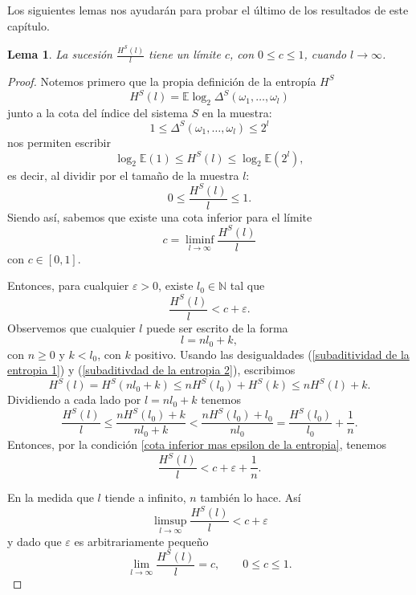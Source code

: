 \documentclass{report}
\newtheorem{lem}{Lema}[section]
\begin{document}
Los siguientes lemas nos ayudarán para probar el último de los resultados de este capítulo.\newline

\begin{lem}\label{lema 3}
    La sucesión \( \frac{H^{\mathcal{S}}(l)}{l} \) tiene un límite \( c \), con \( 0 \leq c \leq 1 \), cuando \( l \to \infty \).
\end{lem}
    
\begin{proof}
    Notemos primero que la propia definición de la entropía $H^S$
    \[
    H^S(l) = \mathbb{E}\log_2 \Delta^S(\omega_1,\ldots,\omega_l)
    \] 
    junto a la cota del índice del sistema $S$ en la muestra:
    \[
    1 \leq \Delta^S(\omega_1,\ldots,\omega_l) \leq 2^l
    \]
    nos permiten escribir
    \[
    \log_2 \mathbb{E} (1) \leq H^S(l) \leq \log_2 \mathbb{E} \left(2^l\right),
    \]
    es decir, al dividir por el tamaño de la muestra $l$:
    \begin{equation} \label{cota de la entropia}
        0 \leq \frac{H^S(l)}{l} \leq 1.
    \end{equation}
    Siendo así, sabemos que existe una cota inferior para el límite
    \[
    c = \liminf_{l\to\infty} \frac{H^S(l)}{l}
    \]
    con $c\in [0,1]$.

    Entonces, para cualquier $\varepsilon>0$, existe $l_0\in\mathbb{N}$ tal que
    \begin{equation}\label{cota inferior mas epsilon de la entropia}
        \frac{H^S(l)}{l} < c + \varepsilon.
    \end{equation}
    Observemos que cualquier $l$ puede ser escrito de la forma
    \[
        l = n l_0 + k,
    \]
    con $n\geq 0$ y $k<l_0$, con $k$ positivo. Usando las desigualdades (\ref{subaditividad de la entropia 1}) 
    y (\ref{subaditivdad de la entropia 2}), escribimos
    \begin{equation*}
        H^S(l) = H^S(nl_0+k) \leq nH^S(l_0) + H^S(k) \leq nH^S(l) + k.
    \end{equation*}
    Dividiendo a cada lado por $l=nl_0+k$ tenemos
    \[
        \frac{H^S(l)}{l} \leq \frac{nH^S(l_0) + k}{nl_0+k} < \frac{nH^S(l_0) + l_0}{nl_0} = \frac{H^S(l_0)}{l_0} + \frac{1}{n}.
    \]
    Entonces, por la condición \ref{cota inferior mas epsilon de la entropia}, tenemos
    \[
    \frac{H^S(l)}{l} < c + \varepsilon + \frac{1}{n}.
    \]

    En la medida que $l$ tiende a infinito, $n$ también lo hace. Así
    \[
        \limsup_{l\to\infty} \frac{H^S(l)}{l} < c + \varepsilon
    \]
y dado que $\varepsilon$ es arbitrariamente pequeño
    \[
        \lim_{l\to\infty} \frac{H^S(l)}{l} = c, \qquad 0\leq c\leq 1.
    \]
\end{proof}
\end{document}
